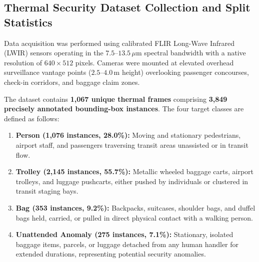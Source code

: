 \documentclass[journal,twoside,web]{ieeecolor}
\begin{document}
\subsection{Thermal Security Dataset Collection and Split Statistics}
Data acquisition was performed using calibrated FLIR Long-Wave Infrared (LWIR) sensors operating in the $7.5\text{--}13.5\,\mu\text{m}$ spectral bandwidth with a native resolution of $640\times512$ pixels. Cameras were mounted at elevated overhead surveillance vantage points ($2.5\text{--}4.0$\,m height) overlooking passenger concourses, check-in corridors, and baggage claim zones.

The dataset contains \textbf{1,067 unique thermal frames} comprising \textbf{3,849 precisely annotated bounding-box instances}. The four target classes are defined as follows:
\begin{enumerate}
    \item \textbf{Person (1,076 instances, 28.0\%):} Moving and stationary pedestrians, airport staff, and passengers traversing transit areas unassisted or in transit flow.
    \item \textbf{Trolley (2,145 instances, 55.7\%):} Metallic wheeled baggage carts, airport trolleys, and luggage pushcarts, either pushed by individuals or clustered in transit staging bays.
    \item \textbf{Bag (353 instances, 9.2\%):} Backpacks, suitcases, shoulder bags, and duffel bags held, carried, or pulled in direct physical contact with a walking person.
    \item \textbf{Unattended Anomaly (275 instances, 7.1\%):} Stationary, isolated baggage items, parcels, or luggage detached from any human handler for extended durations, representing potential security anomalies.
\end{enumerate}
\end{document}
